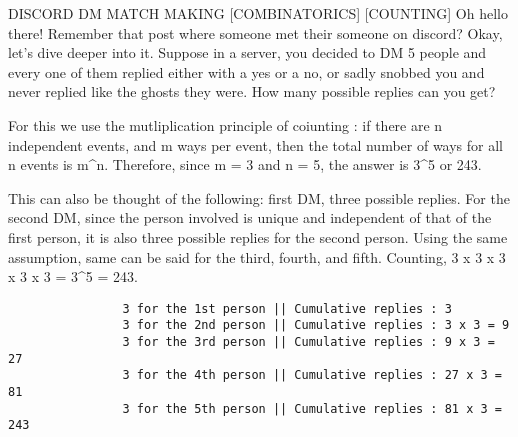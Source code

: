 \documentclass[answers]{exam}
\begin{document}
\begin{questions}
		\question
		DISCORD DM MATCH MAKING [COMBINATORICS] [COUNTING]
		Oh hello there! Remember that post where someone met their someone on discord? Okay, let's
		dive deeper into it. Suppose in a server, you decided to DM 5 people and every one of them replied either with a yes or a no, or sadly snobbed you and never replied like the ghosts they were. How many possible replies can you get?
		
		\begin{solution}
			For this we use the mutliplication principle of coiunting : if there are n independent events, and m ways per event, then the total number of ways for all n events is m\^{}n. Therefore, since m = 3 and n = 5, the answer is 3\^{}5 or 243. 
			
			This can also be thought of the following: first DM, three possible replies. For the second DM, since the person involved is unique and independent of that of the first person, it is also three possible replies for the second person. Using the same assumption, same can be said for the third, fourth, and fifth. Counting, 3 x 3 x 3 x 3 x 3 = 3\^{}5 = 243. 
			\begin{verbatim}
				3 for the 1st person || Cumulative replies : 3
				3 for the 2nd person || Cumulative replies : 3 x 3 = 9
				3 for the 3rd person || Cumulative replies : 9 x 3 = 27
				3 for the 4th person || Cumulative replies : 27 x 3 = 81
				3 for the 5th person || Cumulative replies : 81 x 3 = 243
			\end{verbatim}
		\end{solution}
		
	\end{questions}
\end{document}
